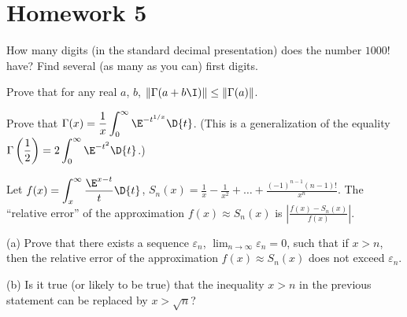 

\section*{Homework 5}\renewcommand{\leftmark}{Homework 5}

\begin{exercise}
How many digits (in the standard decimal presentation) does the
number $1000!$ have? Find several (as many as you can) first
digits. 
\end{exercise}
\begin{exercise}
Prove that for any real $a$, $b$, $\|\Gamma(a +
b\I)\|\leq\|\Gamma(a)\|$. 
\end{exercise}
\begin{exercise}
Prove that
$\displaystyle\Gamma(x)=\frac{1}{x}\int^{\infty}_{0}\E^{-t^{1/x}}\D{t}$.
(This is a generalization of the equality
$\displaystyle\Gamma\left(\frac{1}{2}\right)=2\int^{\infty}_{0}\E^{-t^{2}}\D{t}$.)
\end{exercise}
\begin{exercise}
Let $\displaystyle
f(x)=\int^{\infty}_{x}\frac{\E^{x-t}}{t}\D{t}$, $\displaystyle S_{n}(x)=\frac{1}{x}-\frac{1}{x^{2}}+\dots+\frac{(-1)^{n-1}(n-1)!}{x^{n}}$.
The ``relative error'' of the approximation $f(x)\approx
S_{n}(x)$ is $\displaystyle\left|\frac{f(x)-S_{n}(x)}{f(x)}\right|$.

(a) Prove that there exists a sequence $\varepsilon_{n}$, $\lim_{n\to\infty}\varepsilon_{n}=0$,
such that if $x>n$, then the relative error of the approximation
$f(x)\approx S_{n}(x)$ does not exceed $\varepsilon_{n}$. 

(b) Is it true (or likely to be true) that the inequality $x>n$
in the previous statement can be replaced by $x>\sqrt{n}$?
\end{exercise}
